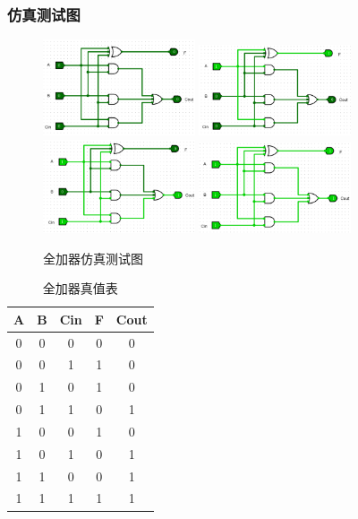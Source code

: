 \documentclass{article}
\begin{document}
    \subsubsection{仿真测试图}
    \begin{figure}[H]
    \centering
    \includegraphics[width=0.4\textwidth]{3.5.1.png}
    \includegraphics[width=0.4\textwidth]{3.5.2.png}
    \includegraphics[width=0.4\textwidth]{3.5.3.png}
    \includegraphics[width=0.4\textwidth]{3.5.4.png}
    \caption{全加器仿真测试图}
    \end{figure}


    \begin{table}[H]
    \centering
    \begin{tabular}{|c c c|c c|}
        \hline
        A & B & Cin & F & Cout \\ \hline
        0 & 0 & 0 & 0 & 0 \\ \hline
        0 & 0 & 1 & 1 & 0 \\ \hline
        0 & 1 & 0 & 1 & 0 \\ \hline
        0 & 1 & 1 & 0 & 1 \\ \hline
        1 & 0 & 0 & 1 & 0 \\ \hline
        1 & 0 & 1 & 0 & 1 \\ \hline
        1 & 1 & 0 & 0 & 1 \\ \hline
        1 & 1 & 1 & 1 & 1 \\ \hline
    \end{tabular}
    \caption{全加器真值表}
    \end{table}
\end{document}
